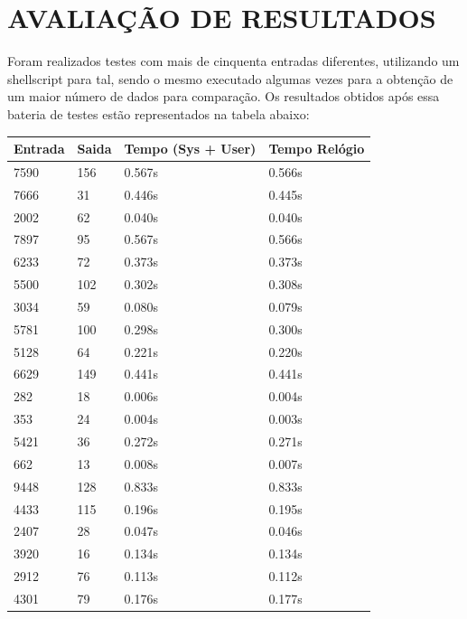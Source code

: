 \documentclass[12pt]{article}
\begin{document}
    \section{AVALIAÇÃO DE RESULTADOS}
        Foram realizados testes com mais de cinquenta entradas diferentes, utilizando um shellscript para tal,
        sendo o mesmo executado algumas vezes para a obtenção de um maior número de dados para comparação.
        Os resultados obtidos após essa bateria de testes estão representados na tabela abaixo:
        \begin{table}[h!]
            \centering
            \begin{tabular}{|l|l|l|l|}
                \hline
                Entrada & Saida & Tempo (Sys + User) & Tempo Relógio \\ \hline

                7590 & 156 & 0.567s & 0.566s \\ \hline
                7666 & 31 & 0.446s & 0.445s \\ \hline
                2002 & 62 & 0.040s & 0.040s \\ \hline
                7897 & 95 & 0.567s & 0.566s \\ \hline
                6233 & 72 & 0.373s & 0.373s \\ \hline
                5500 & 102 & 0.302s & 0.308s \\ \hline
                3034 & 59 & 0.080s & 0.079s \\ \hline
                5781 & 100 & 0.298s & 0.300s \\ \hline
                5128 & 64 & 0.221s & 0.220s \\ \hline
                6629 & 149 & 0.441s & 0.441s \\ \hline
                282 & 18 & 0.006s& 0.004s \\ \hline
                353 & 24 & 0.004s & 0.003s \\ \hline
                5421 & 36 & 0.272s & 0.271s \\ \hline
                662 & 13 & 0.008s & 0.007s \\ \hline
                9448 & 128 & 0.833s & 0.833s \\ \hline
                4433 & 115 & 0.196s & 0.195s \\ \hline
                2407 & 28 & 0.047s & 0.046s \\ \hline
                3920 & 16 & 0.134s & 0.134s \\ \hline
                2912 & 76 & 0.113s & 0.112s \\ \hline
                4301 & 79 & 0.176s & 0.177s \\ \hline
            \end{tabular}
        \end{table}\\
\end{document}
